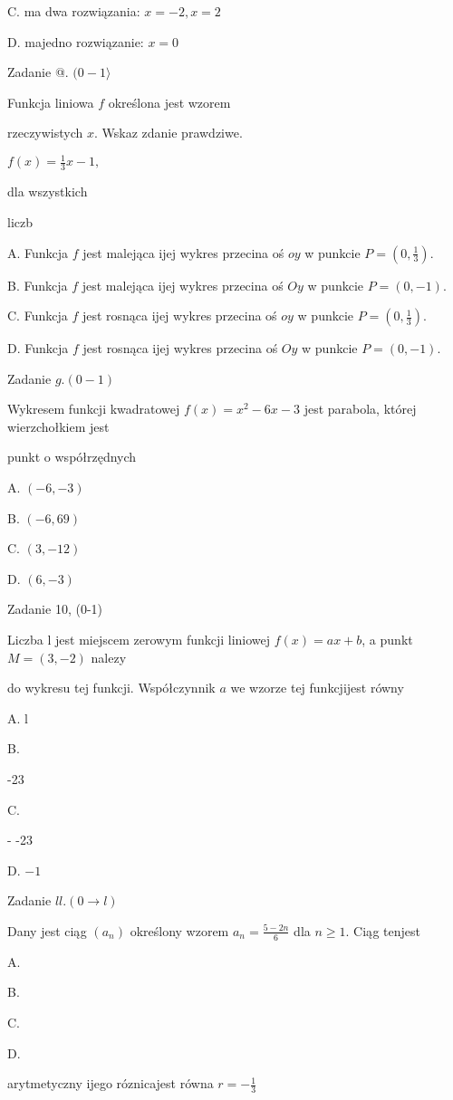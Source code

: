 \documentclass[a4paper,12pt]{article}
\begin{document}
C. ma dwa rozwiązania: $x=-2, x=2$

D. majedno rozwiązanie: $x=0$

Zadanie @. $(0-1\rangle$

Funkcja liniowa $f$ określona jest wzorem

rzeczywistych $x$. Wskaz zdanie prawdziwe.

$f(x)=\displaystyle \frac{1}{3}x-1,$

dla wszystkich

liczb

A. Funkcja $f$ jest malejąca ijej wykres przecina oś $oy$ w punkcie $P=(0,\displaystyle \frac{1}{3}).$

B. Funkcja $f$ jest malejąca ijej wykres przecina oś $Oy$ w punkcie $P=(0,-1).$

C. Funkcja $f$ jest rosnąca ijej wykres przecina oś $oy$ w punkcie $P=(0,\displaystyle \frac{1}{3}).$

D. Funkcja $f$ jest rosnąca ijej wykres przecina oś $Oy$ w punkcie $P=(0,-1).$

Zadanie $g.(0-1)$

Wykresem funkcji kwadratowej $f(x)=x^{2}-6x-3$ jest parabola, której wierzchołkiem jest

punkt o współrzędnych

A. $(-6,-3)$

B. $(-6,69)$

C. $(3,-12)$

D. $(6,-3)$

Zadanie 10, (0-1)

Liczba l jest miejscem zerowym funkcji liniowej $f(x)=ax+b$, a punkt $M=(3,-2)$ nalezy

do wykresu tej funkcji. Współczynnik $a$ we wzorze tej funkcjijest równy

A. l

B.

-23

C.

- -23

D. $-1$

Zadanie $ll. (0\rightarrow l)$

Dany jest ciąg $(a_{n})$ określony wzorem $a_{n}=\displaystyle \frac{5-2n}{6}$ dla $n\geq 1$. Ciąg tenjest

A.

B.

C.

D.

arytmetyczny ijego róznicajest równa $r=-\displaystyle \frac{1}{3}$
\end{document}
